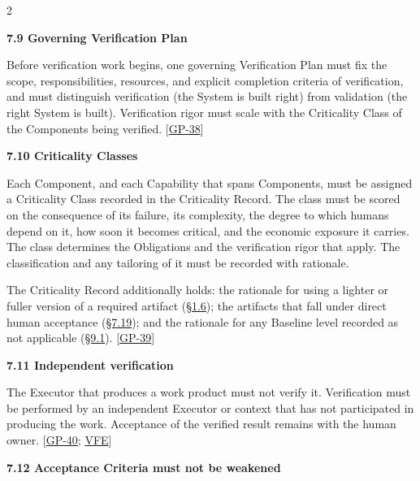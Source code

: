 \begin{multicols}{2}
\hypertarget{nss-7.9}{}

\par\smallskip\noindent\textbf{7.9 Governing Verification Plan}\par\nopagebreak

Before verification work begins, one governing Verification Plan must fix the scope, responsibilities, resources, and explicit completion criteria of verification, and must distinguish verification (the System is built right) from validation (the right System is built). Verification rigor must scale with the Criticality Class of the Components being verified. [\hyperlink{gp-38}{GP-38}]

\hypertarget{nss-7.10}{}

\par\smallskip\noindent\textbf{7.10 Criticality Classes}\par\nopagebreak

Each Component, and each Capability that spans Components, must be assigned a Criticality Class recorded in the Criticality Record. The class must be scored on the consequence of its failure, its complexity, the degree to which humans depend on it, how soon it becomes critical, and the economic exposure it carries. The class determines the Obligations and the verification rigor that apply. The classification and any tailoring of it must be recorded with rationale.

The Criticality Record additionally holds: the rationale for using a lighter or fuller version of a required artifact (\hyperlink{nss-1.6}{\S1.6}); the artifacts that fall under direct human acceptance (\hyperlink{nss-7.19}{\S7.19}); and the rationale for any Baseline level recorded as not applicable (\hyperlink{nss-9.1}{\S9.1}). [\hyperlink{gp-39}{GP-39}]

\hypertarget{nss-7.11}{}

\par\smallskip\noindent\textbf{7.11 Independent verification}\par\nopagebreak

The Executor that produces a work product must not verify it. Verification must be performed by an independent Executor or context that has not participated in producing the work. Acceptance of the verified result remains with the human owner. [\hyperlink{gp-40}{GP-40}; \hyperlink{gp-VFE}{VFE}]

\hypertarget{nss-7.12}{}

\par\smallskip\noindent\textbf{7.12 Acceptance Criteria must not be weakened}\par\nopagebreak


\end{multicols}
